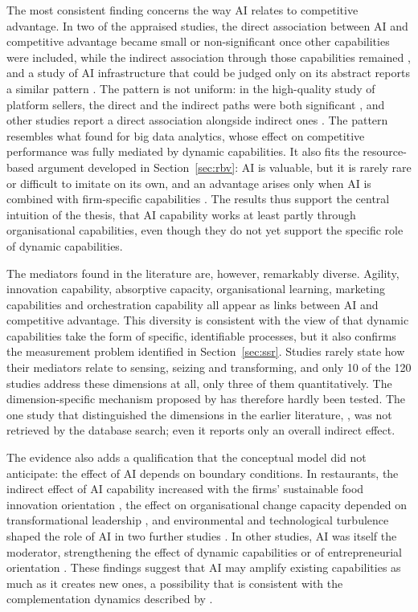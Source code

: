 The most consistent finding concerns the way AI relates to competitive advantage. In two of the appraised studies, the direct association between AI and competitive advantage became small or non-significant once other capabilities were included, while the indirect association through those capabilities remained \parencite{srahin2026, texeira2026}, and a study of AI infrastructure that could be judged only on its abstract reports a similar pattern \parencite{chen2026}. The pattern is not uniform: in the high-quality study of platform sellers, the direct and the indirect paths were both significant \parencite{guo2025}, and other studies report a direct association alongside indirect ones \parencite{tu2026, kokash2026}. The pattern resembles what \textcite{mikalef2020} found for big data analytics, whose effect on competitive performance was fully mediated by dynamic capabilities. It also fits the resource-based argument developed in Section~\ref{sec:rbv}: AI is valuable, but it is rarely rare or difficult to imitate on its own, and an advantage arises only when AI is combined with firm-specific capabilities \parencite{barney1991, kemp2024}. The results thus support the central intuition of the thesis, that AI capability works at least partly through organisational capabilities, even though they do not yet support the specific role of dynamic capabilities.

The mediators found in the literature are, however, remarkably diverse. Agility, innovation capability, absorptive capacity, organisational learning, marketing capabilities and orchestration capability all appear as links between AI and competitive advantage. This diversity is consistent with the view of \textcite{eisenhardt2000} that dynamic capabilities take the form of specific, identifiable processes, but it also confirms the measurement problem identified in Section~\ref{sec:ssr}. Studies rarely state how their mediators relate to sensing, seizing and transforming, and only 10 of the 120 studies address these dimensions at all, only three of them quantitatively. The dimension-specific mechanism proposed by \textcite{teece2007} has therefore hardly been tested. The one study that distinguished the dimensions in the earlier literature, \textcite{selgascors2026}, was not retrieved by the database search; even it reports only an overall indirect effect.

The evidence also adds a qualification that the conceptual model did not anticipate: the effect of AI depends on boundary conditions. In restaurants, the indirect effect of AI capability increased with the firms' sustainable food innovation orientation \parencite{texeira2026}, the effect on organisational change capacity depended on transformational leadership \parencite{sofiyan2026}, and environmental and technological turbulence shaped the role of AI in two further studies \parencite{aldhaheri2024, kokash2026}. In other studies, AI was itself the moderator, strengthening the effect of dynamic capabilities \parencite{quoc2026} or of entrepreneurial orientation \parencite{wang2026}. These findings suggest that AI may amplify existing capabilities as much as it creates new ones, a possibility that is consistent with the complementation dynamics described by \textcite{krakowski2023}.

